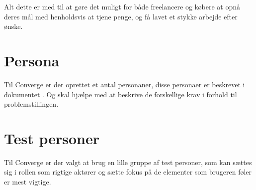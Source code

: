 Alt dette er med til at gøre det muligt for både freelancere og købere at opnå deres mål med henholdsvis at tjene penge, og få lavet et stykke arbejde efter ønske.

\section{Persona}

Til Converge er der oprettet et antal personaner, disse personaer er beskrevet i dokumentet \cite{document-requirements}. Og skal hjælpe med at beskrive de forskellige krav i forhold til problemstillingen.

\section{Test personer}

Til Converge er der valgt at brug en lille gruppe af test personer, som kan sættes sig i rollen som rigtige aktører og sætte fokus på de elementer som brugeren føler er mest vigtige.